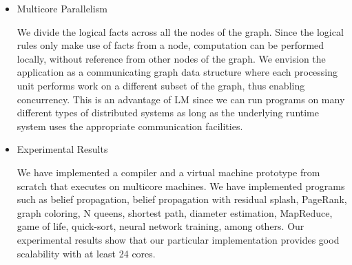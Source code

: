 \begin{itemize}
   \item Multicore Parallelism
   
   We divide the logical facts across all the nodes of the graph. Since the
   logical rules only make use of facts from a node, computation can be
   performed locally, without reference from other nodes of the graph.
   We envision the application as a communicating graph data structure where
   each processing unit performs work on a different subset of the graph, thus
   enabling concurrency. This is an advantage of LM since we can run programs on
   many different types of distributed systems as long as the underlying runtime
   system uses the appropriate communication facilities.

   \item Experimental Results

   We have implemented a compiler and a virtual machine prototype from
   scratch that executes on multicore machines.  We have implemented programs
   such as belief propagation, belief propagation with residual splash,
   PageRank, graph coloring, N queens, shortest path, diameter estimation,
   MapReduce, game of life, quick-sort, neural network training, among others.
   Our experimental results show that our particular implementation provides
   good scalability with at least 24 cores.
   
\end{itemize}
